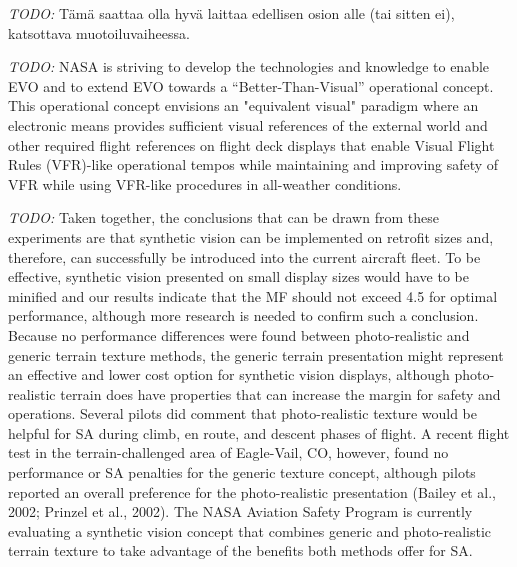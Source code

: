 \documentclass[utf8,bachelor,manualbib]{gradu3}
\begin{document}
\emph{TODO:}
Tämä saattaa olla hyvä laittaa edellisen osion alle (tai sitten ei), katsottava muotoiluvaiheessa.

\emph{TODO:}
NASA is striving to develop the technologies and knowledge to enable EVO and to extend EVO towards a “Better-Than-Visual” operational concept. This operational concept envisions an "equivalent visual" paradigm where an electronic means provides sufficient visual references of the external world and other required flight references on flight deck displays that enable Visual Flight Rules (VFR)-like operational tempos while maintaining and improving safety of VFR while using VFR-like procedures in all-weather conditions.\citep{prinzel2013}

\emph{TODO:}
Taken together, the conclusions that can be drawn from these experiments are that
synthetic vision can be implemented on retrofit sizes and, therefore, can successfully
be introduced into the current aircraft fleet. To be effective, synthetic vision
presented on small display sizes would have to be minified and our results indicate
that the MF should not exceed 4.5 for optimal performance, although more research
is needed to confirm such a conclusion.
Because no performance differences were found between photo-realistic and
generic terrain texture methods, the generic terrain presentation might represent an
effective and lower cost option for synthetic vision displays, although photo-realistic
terrain does have properties that can increase the margin for safety and operations.
Several pilots did comment that photo-realistic texture would be helpful for
SA during climb, en route, and descent phases of flight. A recent flight test in the
terrain-challenged area of Eagle-Vail, CO, however, found no performance or SA
penalties for the generic texture concept, although pilots reported an overall preference
for the photo-realistic presentation (Bailey et al., 2002; Prinzel et al., 2002).
The NASA Aviation Safety Program is currently evaluating a synthetic vision concept
that combines generic and photo-realistic terrain texture to take advantage of
the benefits both methods offer for SA. \citep{prinzel2004}
\end{document}
